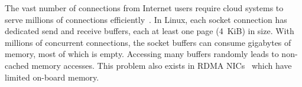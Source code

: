 




The vast number of connections from Internet users require cloud systems to serve millions of connections efficiently~\cite{nishtala2013scaling,lin2016scalable,belay2017ix}. %
In Linux, each socket connection has dedicated send and receive buffers, each at least one page (4~KiB) in size. With millions of concurrent connections, the socket buffers can consume gigabytes of memory, most of which is empty. Accessing many buffers randomly leads to non-cached memory accesses. This problem also exists in RDMA NICs~\cite{mprdma,kaminsky2016design} which have limited on-board memory.

